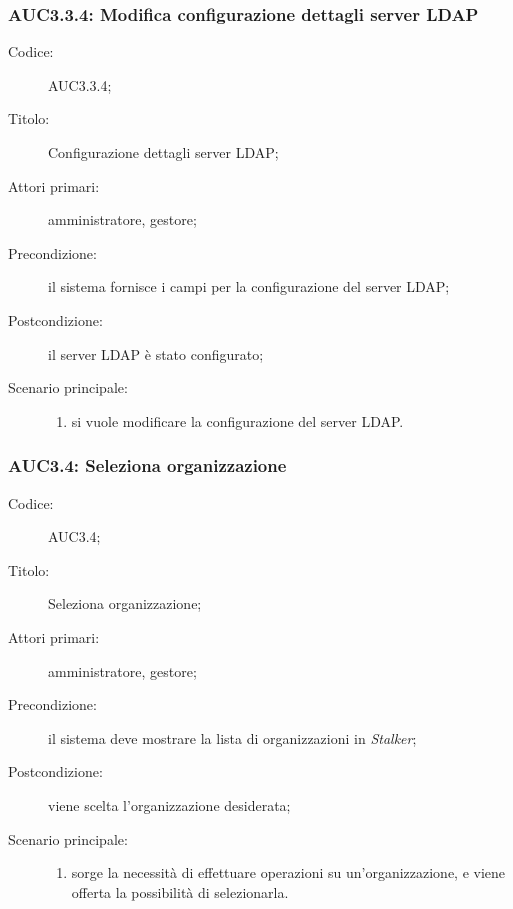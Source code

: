 \documentclass[../../../analisi-dei-requisiti.tex]{subfiles}
\begin{document}
\subsubsection{AUC3.3.4: Modifica configurazione dettagli server LDAP}%
\label{subs:AUC3.3.4}
\begin{description}
  \item[Codice:] AUC3.3.4;
  \item[Titolo:] Configurazione dettagli server LDAP;
  \item[Attori primari:] amministratore, gestore;
  \item[Precondizione:] il sistema fornisce i campi per la configurazione del server LDAP;
  \item[Postcondizione:] il server LDAP è stato configurato;
  \item[Scenario principale:]
        \begin{enumerate}
          \item si vuole modificare la configurazione del server LDAP.
        \end{enumerate}
\end{description}

\subsubsection{AUC3.4: Seleziona organizzazione}%
\label{subs:AUC3.4}
\begin{description}
  \item[Codice:] AUC3.4;
  \item[Titolo:] Seleziona organizzazione;
  \item[Attori primari:] amministratore, gestore;
  \item[Precondizione:] il sistema deve mostrare la lista di organizzazioni in \emph{Stalker};
  \item[Postcondizione:] viene scelta l'organizzazione desiderata;
  \item[Scenario principale:]
        \begin{enumerate}
          \item sorge la necessità di effettuare operazioni su un'organizzazione, e viene offerta la possibilità di selezionarla.
        \end{enumerate}
\end{description}
\end{document}

